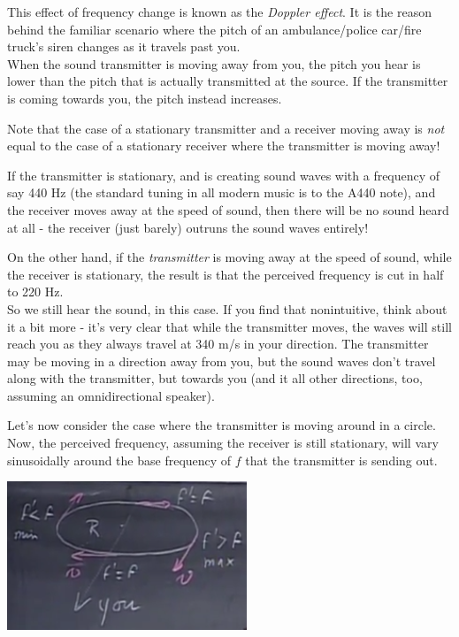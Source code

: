 \documentclass[8.01x]{subfiles}
\begin{document}
This effect of frequency change is known as the \emph{Doppler effect}. It is the reason behind the familiar scenario where the pitch of an ambulance/police car/fire truck's siren changes as it travels past you.\\
When the sound transmitter is moving away from you, the pitch you hear is lower than the pitch that is actually transmitted at the source. If the transmitter is coming towards you, the pitch instead increases.

Note that the case of a stationary transmitter and a receiver moving away is \emph{not} equal to the case of a stationary receiver where the transmitter is moving away!

If the transmitter is stationary, and is creating sound waves with a frequency of say 440 Hz (the standard tuning in all modern music is to the A440 note), and the receiver moves away at the speed of sound, then there will be no sound heard at all - the receiver (just barely) outruns the sound waves entirely!

On the other hand, if the \emph{transmitter} is moving away at the speed of sound, while the receiver is stationary, the result is that the perceived frequency is cut in half to 220 Hz.\\
So we still hear the sound, in this case. If you find that nonintuitive, think about it a bit more - it's very clear that while the transmitter moves, the waves will still reach you as they always travel at 340 m/s in your direction. The transmitter may be moving in a direction away from you, but the sound waves don't travel along with the transmitter, but towards you (and it all other directions, too, assuming an omnidirectional speaker).

Let's now consider the case where the transmitter is moving around in a circle. Now, the perceived frequency, assuming the receiver is still stationary, will vary sinusoidally around the base frequency of $f$ that the transmitter is sending out.

\begin{center}
\includegraphics[scale=0.6]{Graphics/lec23_doppler}
\end{center}
\end{document}
